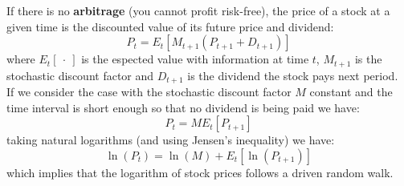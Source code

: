 If there is no \textbf{arbitrage} (you cannot profit risk-free), the price of a stock at a given time is the discounted value of its future price and dividend:
\begin{equation*}
    P_{t}=E_{t}[M_{t+1}(P_{t+1}+D_{t+1})]
\end{equation*}
where $E_{t}[\ \cdot\ ]$ is the espected value with information at time $t$, $M_{t+1}$ is the stochastic discount factor and $D_{t+1}$ is the dividend the stock pays next period.\\

If we consider the case with the stochastic discount factor $M$ constant and the time interval is short enough so that no dividend is being paid we have:
\begin{equation*}
    P_{t} = M E_{t}[P_{t+1}]
\end{equation*}
taking natural logarithms (and using Jensen's inequality) we have:
\begin{equation*}
    \ln(P_{t}) = \ln(M) + E_{t}[\ln(P_{t+1})]
\end{equation*}
which implies that the logarithm of stock prices follows a driven random walk.
